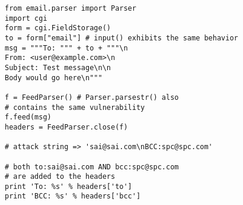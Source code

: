 \begin{lstlisting}
from email.parser import Parser
import cgi
form = cgi.FieldStorage()
to = form["email"] # input() exhibits the same behavior
msg = """To: """ + to + """\n
From: <user@example.com>\n
Subject: Test message\n\n
Body would go here\n"""

f = FeedParser() # Parser.parsestr() also 
# contains the same vulnerability
f.feed(msg)
headers = FeedParser.close(f)

# attack string => 'sai@sai.com\nBCC:spc@spc.com'

# both to:sai@sai.com AND bcc:spc@spc.com 
# are added to the headers
print 'To: %s' % headers['to']
print 'BCC: %s' % headers['bcc']
\end{lstlisting}